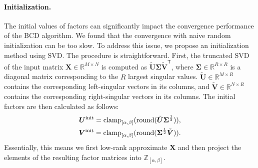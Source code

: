 


\paragraph{Initialization.}
The initial values of factors can significantly impact the convergence performance of the BCD algorithm. We found that the convergence with naive random initialization can be too slow. To address this issue, we propose an initialization method using SVD. The procedure is straightforward. First, the truncated SVD of the input matrix $\bm{X} \in \mathbb{R}^{M \times N}$ is computed as $\tilde{\bm{U}} \bm{\Sigma} \tilde{\bm{V}}^\mathsf{T}$, where $\bm{\Sigma} \in \mathbb{R}^{R \times R}$ is a diagonal matrix corresponding to the $R$ largest singular values. $\tilde{\bm{U}} \in \mathbb{R}^{M \times R}$ contains the corresponding left-singular vectors in its columns, and $\tilde{\bm{V}} \in \mathbb{R}^{N \times R}$ contains the corresponding right-singular vectors in its columns. The initial factors are then calculated as follows:
\begin{align} 
	\bm{U}^{\rm init} = \operatorname{clamp}_{[\alpha,\beta]}(\operatorname{round}(\tilde{\bm{U}} \bm{\Sigma}^\frac{1}{2})), \label{eq: initialization: u} \\
	\bm{V}^{\rm init} = \operatorname{clamp}_{[\alpha,\beta]}(\operatorname{round}(\bm{\Sigma}^\frac{1}{2} \tilde{\bm{V}})). \label{eq: initialization: v}
\end{align}
Essentially, this means we first low-rank approximate $\bm{X}$ and then project the elements of the resulting factor matrices into $\mathbb{Z}_{[\alpha,\beta]}$. 

